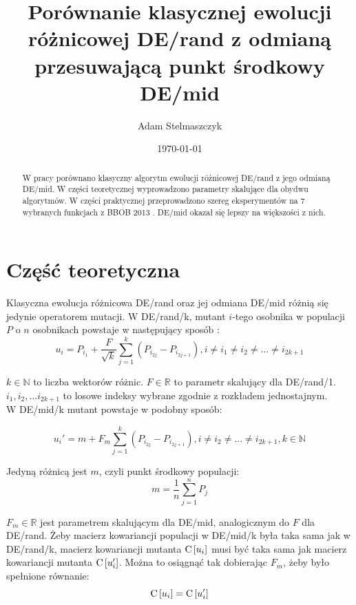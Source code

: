 \documentclass[12pt, a4paper]{article}
\title{\textbf{Porównanie klasycznej ewolucji różnicowej DE/rand z odmianą przesuwającą punkt środkowy DE/mid}}
\author{Adam Stelmaszczyk}
\date{\today}
\def\C{{\rm C}\,}
\begin{document}
\maketitle

\begin{abstract}
W pracy porównano klasyczny algorytm ewolucji różnicowej DE/rand z jego odmianą DE/mid.
W części teoretycznej wyprowadzono parametry skalujące dla obydwu algorytmów. W części praktycznej
przeprowadzono szereg eksperymentów na 7 wybranych funkcjach z BBOB 2013 \cite{hansen}. DE/mid
okazał się lepszy na większości z nich.
\end{abstract}

\section{Część teoretyczna}

Klasyczna ewolucja różnicowa DE/rand oraz jej odmiana DE/mid różnią się jedynie operatorem mutacji.
W DE/rand/k, mutant $i$-tego osobnika w populacji $P$ o $n$ osobnikach powstaje w następujący sposób \cite{opara}:
\begin{equation} \label{eq:derand}
u_i = P_{i_1} + \frac{F}{\sqrt{k}}\sum\limits_{j=1}^k (P_{i_{2j}} - P_{i_{2j+1}}),
i \neq i_1 \neq i_2 \neq \dots \neq i_{2k+1}
\end{equation}

$k \in \mathbb{N}$ to liczba wektorów różnic. $F\in\mathbb{R}$ to parametr skalujący dla DE/rand/1. 
$i_1, i_2, \dots i_{2k+1}$ to losowe indeksy wybrane zgodnie z rozkładem jednostajnym.\\

W DE/mid/k mutant powstaje w podobny sposób:

\begin{equation} \label{eq:demid}
u_i' = m + F_m\sum\limits_{j=1}^k (P_{i_{2j}} - P_{i_{2j+1}}), 
i \neq i_2 \neq \dots \neq i_{2k+1}, k \in \mathbb{N}
\end{equation}

Jedyną różnicą jest $m$, czyli punkt środkowy populacji:
\begin{equation} \label{eq:midpoint}
m = \frac{1}{n}\sum\limits_{j=1}^n P_j
\end{equation}

$F_m\in\mathbb{R}$ jest parametrem skalującym dla DE/mid, analogicznym do $F$ dla DE/rand. 
Żeby macierz kowariancji populacji w DE/mid/k była taka sama jak w DE/rand/k, 
macierz kowariancji mutanta $\C[u_i]$ musi być taka sama jak macierz kowariancji mutanta $\C[u_i']$.
Można to osiągnąć tak dobierając $F_m$, żeby było spełnione równanie:
\begin{equation} \label{eq:rownanie}
\C[u_i] = \C[u_i']
\end{equation}
\end{document}
